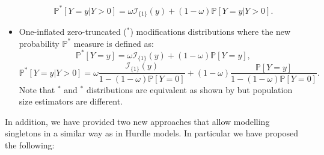 \documentclass[
]{jss}
\newcommand{\1}{\mathcal{I}} \newcommand{\bZero}{\boldsymbol{0}}
\begin{document}
\begin{itemize}
    \begin{equation*}
        \mathbb{P}^{\ast}[Y=y|Y>0]=\omega\mathcal{I}_{\{1\}}(y)+(1-\omega)\mathbb{P}[Y=y|Y>0].
    \end{equation*}
    \item One-inflated zero-truncated ($^\ast$) modifications distributions where the new probability $\mathbb{P}^{\ast}$ measure is defined as:
    \begin{equation*}
        \mathbb{P}^{\ast}[Y=y] = \omega \mathcal{I}_{\{1\}}(y)+(1-\omega)\mathbb{P}[Y=y],
    \end{equation*}
    \begin{equation*}
        \mathbb{P}^{\ast}[Y=y|Y>0] = 
        \omega\frac{\mathcal{I}_{\{1\}}(y)}{1-(1-\omega)\mathbb{P}[Y=0]}+
        (1-\omega)\frac{\mathbb{P}[Y=y]}{1-(1-\omega)\mathbb{P}[Y=0]}.
    \end{equation*}
    Note that $^\ast$ and $^\ast$ distributions are equivalent as shown by \cite{bohning2023equivalence} but population size estimators are different.
\end{itemize}

In addition, we have provided two new approaches that allow modelling
singletons in a similar way as in Hurdle models. In particular we have
proposed the following:
\end{document}
